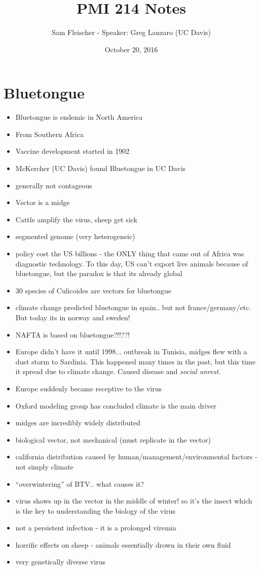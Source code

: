 \documentclass{article}
\title{PMI 214 Notes}
\author{Sam Fleischer - Speaker: Greg Lanzaro (UC Davis)}
\date{October 20, 2016}
\begin{document}
    \maketitle

    \section{Bluetongue}
    \begin{itemize}
        \item Bluetongue is endemic in North America
        \item From Southern Africa
        \item Vaccine development started in 1902
        \item McKercher (UC Davis) found Bluetongue in UC Davis
        \item generally not contageous
        \item Vector is a midge
        \item Cattle amplify the virus, sheep get sick
        \item segmented genome (very heterogeneic)
        \item policy cost the US billions - the ONLY thing that came out of Africa was diagnostic technology.  To this day, US can't export live animals because of bluetongue, but the paradox is that its already global
        \item 30 species of Culicoides are vectors for bluetongue
        \item climate change predicted bluetongue in spain.. but not france/germany/etc.  But today its in norway and sweden!
        \item NAFTA is based on bluetongue?!!??!
        \item Europe didn't have it until 1998... outbreak in Tunisia, midges flew with a dust storm to Sardinia.  This happened many times in the past, but this time it spread due to climate change.  Caused disease and \emph{social unrest}.
        \item Europe suddenly became receptive to the virus
        \item Oxford modeling group has concluded climate is the main driver
        \item midges are incredibly widely distributed
        \item biological vector, not mechanical (must replicate in the vector)
        \item california distribution caused by human/management/environmental factors - not simply climate
        \item ``overwintering'' of BTV.. what causes it?
        \item virus shows up in the vector in the middle of winter! so it's the insect which is the key to understanding the biology of the virus
        \item not a persistent infection - it is a prolonged viremia
        \item horrific effects on sheep - animals essentially drown in their own fluid
        \item very genetically diverse virus
    \end{itemize}
\end{document}
